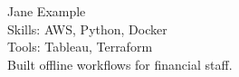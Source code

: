 \documentclass{article}
\begin{document}
Jane Example\\
Skills: AWS, Python, Docker\\
{Tools: Tableau, Terraform\\
Built offline workflows for financial staff.}
\end{document}
